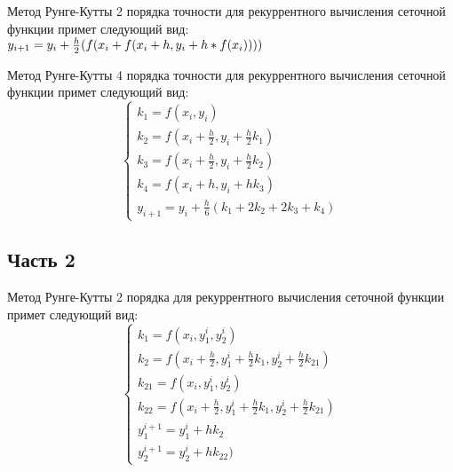 \documentclass[a4paper,12pt,titlepage,finall]{article}
\begin{document}
Метод Рунге-Кутты 2 порядка точности для рекуррентного вычисления сеточной функции примет следующий вид:
~\\

			$y_{i + 1} = y_{i} + \frac{h}{2}(f(x_{i} + f(x_{i} + h, y_{i} + h * f(x_{i}))))\\$




Метод Рунге-Кутты 4 порядка точности для рекуррентного вычисления сеточной функции примет следующий вид:
	\begin{equation*}
		\begin{cases}
			k_{1} = f(x_{i}, y_{i})\\
			k_{2} = f(x_{i} + \frac{h}{2}, y_{i} + \frac{h}{2}k_{1})\\
			k_{3} = f(x_{i} + \frac{h}{2}, y_{i} + \frac{h}{2}k_{2})\\
			k_{4} = f(x_{i} + h, y_{i} + hk_{3})\\
			y_{i + 1} = y_{i} + \frac{h}{6}(k_{1} + 2k_{2} + 2k_{3} + k_{4})
		\end{cases}
\end{equation*}


\newpage

\subsection{Часть 2}

Метод Рунге-Кутты 2 порядка для рекуррентного вычисления сеточной функции примет следующий вид:
\begin{equation*}
\begin{cases}
k_{1} = f(x_{i}, y^{i}_{1}, y^{i}_{2})\\
k_{2} = f(x_{i} + \frac{h}{2}, y^{i}_{1} + \frac{h}{2}k_{1}, y^{i}_{2} + \frac{h}{2}k_{21})\\
k_{21} = f(x_{i}, y^{i}_{1}, y^{i}_{2})\\
k_{22} = f(x_{i} + \frac{h}{2}, y^{i}_{1} + \frac{h}{2}k_{1}, y^{i}_{2} + \frac{h}{2}k_{21})\\

y^{i + 1}_{1} = y^{i}_{1} + hk_{2} \\
y^{i + 1}_{2} = y^{i}_{2} + hk_{22})
\end{cases}
\end{equation*}
\end{document}
